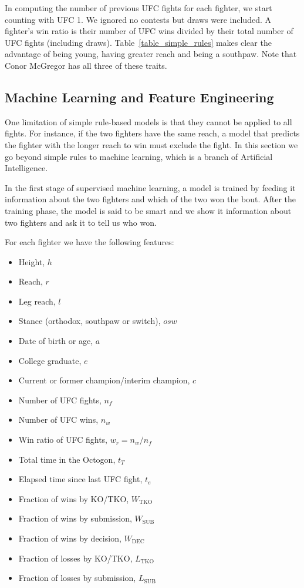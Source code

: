 In computing the number of previous UFC fights for each fighter, we start
counting with UFC 1. We ignored no contests but draws were included. A fighter's
win ratio is their number of UFC wins divided by their
total number of UFC fights (including draws).
Table~\ref{table_simple_rules} makes clear the advantage of being young, having
greater reach and being a southpaw.  Note that Conor McGregor has all three of
these traits.

\subsection*{Machine Learning and Feature Engineering}

One limitation of simple rule-based models is that they
cannot be applied to all fights. For instance, if the two fighters
have the same reach, a model that predicts the fighter with the longer
reach to win must exclude the fight.
In this section we go beyond simple rules to machine learning,
which is a branch of Artificial Intelligence.

In the first stage of supervised machine learning, a model
is trained by feeding it information about the two fighters
and which of the two won the bout. After the training phase,
the model is said to be smart and we show it information about
two fighters and ask it to tell us who won.

For each fighter we have the following features:

\begin{itemize}[noitemsep]
  \item Height, $h$
  \item Reach, $r$
  \item Leg reach, $l$
  \item Stance (orthodox, southpaw or switch), $osw$
  \item Date of birth or age, $a$
  \item College graduate, $e$
  \item Current or former champion/interim champion, $c$
  \item Number of UFC fights, $n_f$
  \item Number of UFC wins, $n_w$
  \item Win ratio of UFC fights, $w_r=n_w/n_f$
  \item Total time in the Octogon, $t_T$
  \item Elapsed time since last UFC fight, $t_e$
  \item Fraction of wins by KO/TKO, $W_{\textrm{TKO}}$
  \item Fraction of wins by submission, $W_{\textrm{SUB}}$
  \item Fraction of wins by decision, $W_{\textrm{DEC}}$
  \item Fraction of losses by KO/TKO, $L_{\textrm{TKO}}$
  \item Fraction of losses by submission, $L_{\textrm{SUB}}$
\end{itemize}

